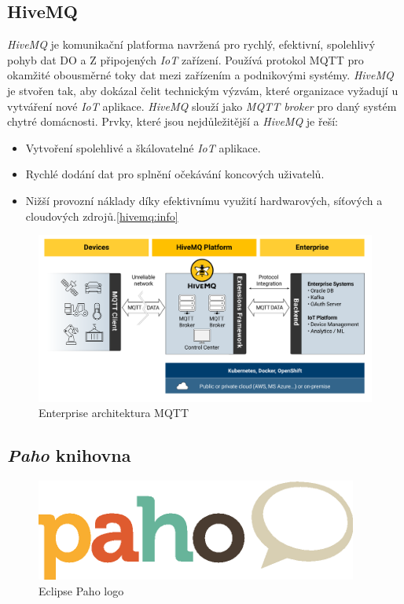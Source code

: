 \newpage
\subsection*{HiveMQ}
\label{pouzite:hivemq}

\emph{HiveMQ} je komunikační platforma navržená pro rychlý, efektivní, spolehlivý pohyb dat DO a Z připojených \emph{IoT} zařízení.
Používá protokol MQTT pro okamžité obousměrné toky dat mezi zařízením a podnikovými systémy.
\emph{HiveMQ} je stvořen tak, aby dokázal čelit technickým výzvám, které organizace vyžadují u vytváření nové \emph{IoT} aplikace.
\emph{HiveMQ} slouží jako \emph{MQTT broker} pro daný systém chytré domácnosti.
\newline
Prvky, které jsou nejdůležitější a \emph{HiveMQ} je řeší:
\begin{itemize}
  \item Vytvoření spolehlivé a škálovatelné \emph{IoT} aplikace.
  \item Rychlé dodání dat pro splnění očekávání koncových uživatelů.
  \item Nižší provozní náklady díky efektivnímu využití hardwarových, síťových a cloudových zdrojů.\ref{hivemq:info}
\end{itemize}

\begin{figure}[hbt]
  \centering
  \includegraphics[width=1 \linewidth]{obrazky-figures/hivemq_arch.png}
  \caption{Enterprise architektura MQTT}
  \label{figure:hivemq_flow}
\end{figure}

\subsection*{\emph{Paho} knihovna}
\label{pouzite:paho}
\begin{figure}[hbt]
  \centering
  \includegraphics[width=.2 \linewidth]{obrazky-figures/paho.png}
  \caption{Eclipse Paho logo}
  \label{figure:paho}
\end{figure}

